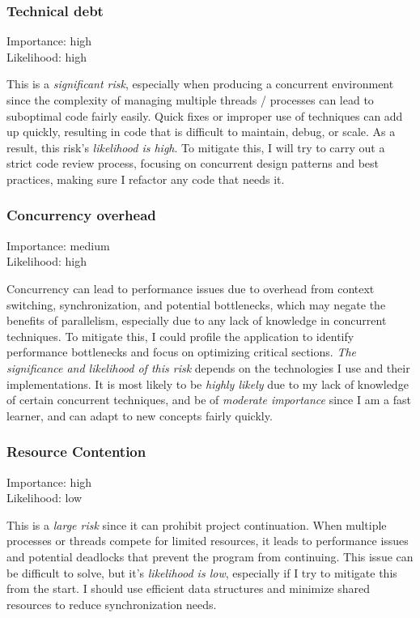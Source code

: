\documentclass[]{plan}
\begin{document}
\subsubsection{Technical debt}
Importance: high\\
Likelihood: high

This is a \textit{significant risk}, especially when producing a concurrent environment since
the complexity of managing multiple threads / processes can lead to suboptimal
code fairly easily. Quick fixes or improper use of techniques can add up quickly,
resulting in code that is difficult to maintain, debug, or scale. As a result, this risk's
\textit{likelihood is high}. To mitigate this, I will try to carry out a strict code review process,
focusing on concurrent design patterns and best practices, making sure I refactor any code that needs it.

\subsubsection{Concurrency overhead}
Importance: medium\\
Likelihood: high

Concurrency can lead to performance issues due to overhead from
context switching, synchronization, and potential bottlenecks, which may
negate the benefits of parallelism, especially due to any lack of knowledge in
concurrent techniques. To mitigate this, I could profile the application to identify
performance bottlenecks and focus on optimizing critical sections. \textit{The significance and likelihood
  of this risk} depends on the technologies I use and their implementations.
It is most likely to be \textit{highly likely} due to my lack of knowledge of certain
concurrent techniques, and be of \textit{moderate importance} since I am a fast learner,
and can adapt to new concepts fairly quickly.

\subsubsection{Resource Contention}
Importance: high\\
Likelihood: low

This is a \textit{large risk} since it can prohibit project continuation. When multiple processes
or threads compete for limited resources, it leads to performance issues and potential
deadlocks that prevent the program from continuing. This issue can be difficult to solve,
but it's \textit{likelihood is low}, especially if I try to mitigate this from the start. I should use
efficient data structures and minimize shared resources to reduce synchronization needs.
\end{document}
